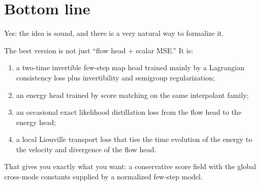 \documentclass[11pt]{article}
\begin{document}
\section{Bottom line}

Yes: the idea is sound, and there is a very natural way to formalize it.

The best version is not just ``flow head + scalar MSE.'' It is:
\begin{enumerate}[label=(\arabic*),itemsep=0.25em,topsep=0.25em]
    \item a two-time invertible few-step map head trained mainly by a Lagrangian consistency loss plus invertibility and semigroup regularization;
    \item an energy head trained by score matching on the same interpolant family;
    \item an occasional exact likelihood distillation loss from the flow head to the energy head;
    \item a local Liouville transport loss that ties the time evolution of the energy to the velocity and divergence of the flow head.
\end{enumerate}

That gives you exactly what you want: a conservative score field with the global cross-mode constants supplied by a normalized few-step model.
\end{document}
